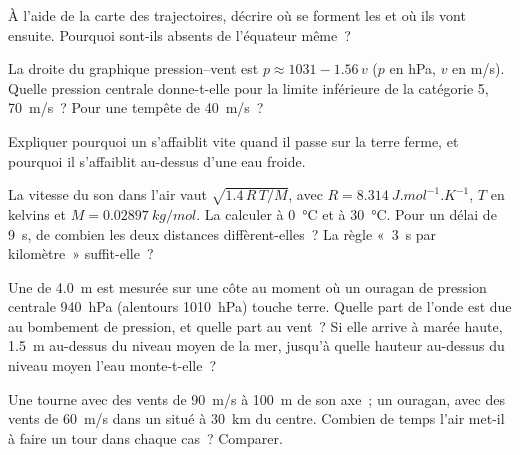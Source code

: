 \begin{exercise}[$\star\star$]\label{exo:g10:storms-and-cyclones:9}
À l'aide de la carte des trajectoires, décrire où se forment les  et où ils vont ensuite. Pourquoi sont-ils absents de l'équateur
même~?
\end{exercise}

\begin{exercise}[$\star\star$]\label{exo:g10:storms-and-cyclones:10}
La droite du graphique pression--vent est $p \approx 1031 - 1.56\,v$
($p$ en \unit{hPa}, $v$ en \unit{m/s}). Quelle pression centrale donne-t-elle
pour la limite inférieure de la catégorie 5, \qty{70}{m/s}~? Pour une
tempête de \qty{40}{m/s}~?
\end{exercise}

\begin{exercise}[$\star\star$]\label{exo:g10:storms-and-cyclones:11}
Expliquer pourquoi un  s'affaiblit vite quand il passe sur
la terre ferme, et pourquoi il s'affaiblit au-dessus d'une eau froide.
\end{exercise}

\begin{exercise}[$\star\star\star$]\label{exo:g10:storms-and-cyclones:12}
La vitesse du son dans l'air vaut $\sqrt{1.4\,R\,T/M}$, avec $R =
\qty{8.314}{J.mol^{-1}.K^{-1}}$, $T$ en kelvins et $M =
\qty{0.02897}{kg/mol}$. La calculer à \qty{0}{\degreeCelsius} et à
\qty{30}{\degreeCelsius}. Pour un délai de \qty{9}{s}, de combien les deux
distances diffèrent-elles~? La règle «~\qty{3}{s} par kilomètre~»
suffit-elle~?
\end{exercise}

\begin{exercise}[$\star\star\star$]\label{exo:g10:storms-and-cyclones:13}
Une  de \qty{4.0}{m} est mesurée sur une côte au moment où
un ouragan de pression centrale \qty{940}{hPa} (alentours \qty{1010}{hPa})
touche terre. Quelle part de l'onde est due au bombement de pression, et
quelle part au vent~? Si elle arrive à marée haute, \qty{1.5}{m} au-dessus
du niveau moyen de la mer, jusqu'à quelle hauteur au-dessus du niveau moyen
l'eau monte-t-elle~?
\end{exercise}

\begin{exercise}[$\star\star\star$]\label{exo:g10:storms-and-cyclones:14}
Une  tourne avec des vents de \qty{90}{m/s} à \qty{100}{m} de son
axe~; un ouragan, avec des vents de \qty{60}{m/s} dans un  situé
à \qty{30}{km} du centre. Combien de temps l'air met-il à faire un tour dans
chaque cas~? Comparer.
\end{exercise}

